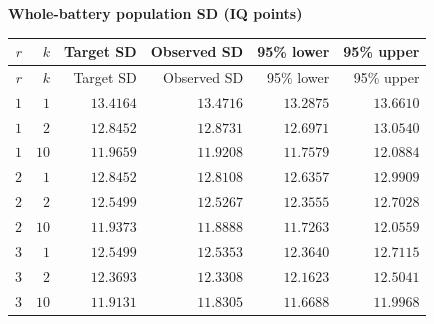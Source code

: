 
\begingroup\small
\setlength{\tabcolsep}{4pt}
\noindent\textbf{Whole-battery population SD (IQ points)}
\begin{longtable}{rrrrrr}
\toprule
$r$ & $k$ & Target SD & Observed SD & 95\% lower & 95\% upper \\
\midrule
\endfirsthead
$r$ & $k$ & Target SD & Observed SD & 95\% lower & 95\% upper \\
\midrule
\endhead
\bottomrule
\endfoot
$1$ & $1$ & $13.4164$ & $13.4716$ & $13.2875$ & $13.6610$ \\
$1$ & $2$ & $12.8452$ & $12.8731$ & $12.6971$ & $13.0540$ \\
$1$ & $10$ & $11.9659$ & $11.9208$ & $11.7579$ & $12.0884$ \\
$2$ & $1$ & $12.8452$ & $12.8108$ & $12.6357$ & $12.9909$ \\
$2$ & $2$ & $12.5499$ & $12.5267$ & $12.3555$ & $12.7028$ \\
$2$ & $10$ & $11.9373$ & $11.8888$ & $11.7263$ & $12.0559$ \\
$3$ & $1$ & $12.5499$ & $12.5353$ & $12.3640$ & $12.7115$ \\
$3$ & $2$ & $12.3693$ & $12.3308$ & $12.1623$ & $12.5041$ \\
$3$ & $10$ & $11.9131$ & $11.8305$ & $11.6688$ & $11.9968$ \\
\end{longtable}
\endgroup
